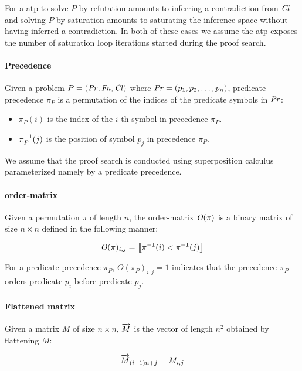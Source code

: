 For a \gls{atp} to solve \(P\) by refutation amounts to inferring a contradiction from \(\operatorname{\mathit{Cl}}\)
and solving \(P\) by saturation amounts to saturating the inference space
without having inferred a contradiction.
In both of these cases we assume the \gls{atp} exposes the number of saturation loop iterations started
during the proof search.

\paragraph{Precedence}
Given a problem \(P = (\operatorname{\mathit{Pr}}, \operatorname{\mathit{Fn}}, \operatorname{\mathit{Cl}})\)
where \(\operatorname{\mathit{Pr}} = (p_1, p_2, \ldots, p_n)\),
predicate precedence \(\pi_P\) is a permutation of the indices
of the predicate symbols in \(\operatorname{\mathit{Pr}}\):

\begin{itemize}
	\item \(\pi_P(i)\) is the index of the \(i\)-th symbol in precedence \(\pi_P\).
	\item \(\pi_P^{-1}(j)\) is the position of symbol \(p_j\) in precedence \(\pi_P\).
\end{itemize}

We assume that the proof search is conducted using superposition calculus
parameterized namely by a predicate precedence.

\paragraph{\Gls{order-matrix}}
Given a permutation \(\pi\) of length \(n\),
the \gls{order-matrix} \(\operatorname{\mathit{O}}(\pi)\) is a binary matrix of size \(n \times n\)
defined in the following manner:

\begin{align*}
\operatorname{\mathit{O}}(\pi)_{i, j} = \left \llbracket \pi^{-1}(i) < \pi^{-1}(j) \right \rrbracket
\end{align*}

For a predicate precedence \(\pi_P\), \(O(\pi_P)_{i, j} = 1\) indicates that
the precedence \(\pi_P\) orders predicate \(p_i\) before predicate \(p_j\).

\paragraph{Flattened matrix}
Given a matrix \(M\) of size \(n \times n\),
\(\overrightarrow{M}\) is the vector of length \(n^2\) obtained by flattening \(M\):

\begin{align*}
\overrightarrow{M}_{(i - 1) n + j} = M_{i, j}
\end{align*}

